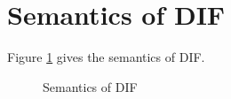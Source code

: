 \section{Semantics of DIF}
Figure \ref{semantics} gives the semantics of DIF.

\begin{figure}[h]
    
    \caption{Semantics of DIF}
    \label{semantics}
\end{figure}
